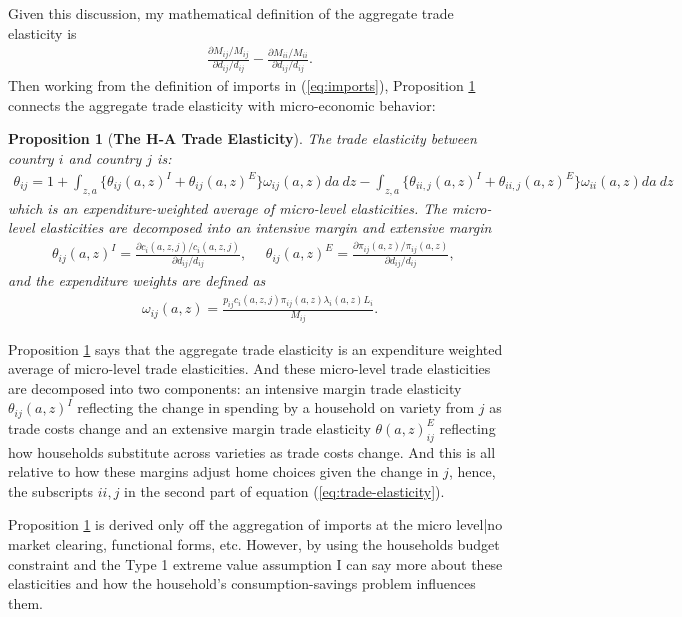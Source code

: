 \documentclass[12pt,pdftex]{article}
\newtheorem{prp}{Proposition}
\begin{document}
\begin{onehalfspacing}
Given this discussion, my mathematical definition of the aggregate trade elasticity is
\begin{align}
\frac{\partial M_{ij} / M_{ij}}{\partial d_{ij} / d_{ij}}  - \frac{\partial M_{ii} / M_{ii}}{\partial d_{ij} / d_{ij}}.
\label{eq:def_trade_elasticity}
\end{align}
Then working from the definition of imports in (\ref{eq:imports}), Proposition \ref{prp:GET} connects the aggregate trade elasticity with micro-economic behavior:
\begin{prp}[\textbf{The H-A Trade Elasticity}] \label{prp:GET} The trade elasticity between country $i$ and country $j$ is:
{\footnotesize
\begin{align}
\theta_{ij} = 1 + \int_{z,a} \bigg \{ \theta_{ij}(a,z)^{I} + \theta_{ij}(a,z)^{E} \bigg \}\omega_{ij}(a,z)da \ dz - \int_{z,a} \bigg \{ \theta_{ii,j}(a,z)^{I} + \theta_{ii,j}(a,z)^{E} \bigg \}\omega_{ii}(a,z)da \ dz
\label{eq:trade-elasticity}
\end{align}
}which is an expenditure-weighted average of micro-level elasticities. The micro-level elasticities are decomposed into an intensive margin and extensive margin
{\footnotesize
\begin{align}
\nonumber
\theta_{ij}(a,z)^{I} = \frac{\partial c_{i}(a,z,j)/ c_{i}(a,z,j)}{\partial d_{ij} / d_{ij}}, \ \ \ \ \ \ \theta_{ij}(a,z)^{E} = \frac{\partial \pi_{ij}(a,z) / \pi_{ij}(a,z)}{\partial d_{ij} / d_{ij}}, \ \ \ \
\end{align}
}
and the expenditure weights are defined as
{\footnotesize
\begin{align}
\nonumber
\omega_{ij}(a,z) = \frac{p_{ij}c_{i}(a,z,j)\pi_{ij}(a,z) \lambda_{i}(a,z) L_i}{M_{ij}}.
\end{align}
}
\end{prp}
Proposition \ref{prp:GET} says that the aggregate trade elasticity is an expenditure weighted average of micro-level trade elasticities. And these micro-level trade elasticities are decomposed into two components: an intensive margin trade elasticity $\theta_{ij}(a,z)^{I}$ reflecting the change in spending by a household on variety from $j$ as trade costs change and an extensive margin trade elasticity $\theta(a,z)_{ij}^{E}$ reflecting how households substitute across varieties as trade costs change. And this is all relative to how these margins adjust home choices given the change in $j$, hence, the subscripts $ii,j$ in the second part of equation (\ref{eq:trade-elasticity}).

Proposition \ref{prp:GET} is derived only off the aggregation of imports at the micro level|no market clearing, functional forms, etc. However, by using the households budget constraint and the Type 1 extreme value assumption I can say more about these elasticities and how the household's consumption-savings problem influences them.


\end{onehalfspacing}
\end{document}
